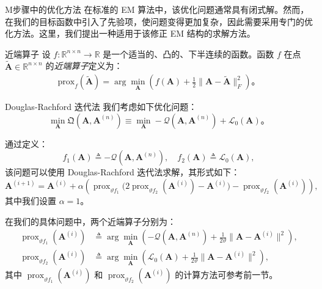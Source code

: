 \documentclass[presentation,aspectratio=169]{ctexbeamer}
\begin{document}
\begin{frame}{M步骤中的优化方法}
在标准的 EM 算法中，该优化问题通常具有闭式解。然而，在我们的目标函数中引入了先验项，使问题变得更加复杂，因此需要采用专门的优化方法。这里，我们提出一种适用于该修正 EM 结构的求解方法。
\end{frame}

\begin{frame}{近端算子}
设 \( f: \mathbb{R}^{n \times n} \to \mathbb{R} \) 是一个适当的、凸的、下半连续的函数。函数 \( f \) 在点 \(\tilde{\mathbf{A}} \in \mathbb{R}^{n \times n}\) 的\textit{近端算子}定义为：
\begin{align}
    \text{prox}_{f}(\tilde{\mathbf{A}}) = \arg\min_{\mathbf{A}} \left( f(\mathbf{A}) + \frac{1}{2} \| \mathbf{A} - \tilde{\mathbf{A}} \|^2_F \right)。
\end{align}
\end{frame}

\begin{frame}{Douglas-Rachford 迭代法}
我们考虑如下优化问题：
\begin{equation}
    \min_{\mathbf{A}} \mathfrak{Q}(\mathbf{A}, \mathbf{A}^{(n)}) \equiv \min_{\mathbf{A}} -\mathcal{Q}(\mathbf{A}, \mathbf{A}^{(n)}) + \mathcal{L}_0(\mathbf{A})。
\end{equation}
\pause

通过定义：
\begin{equation}
    f_1(\mathbf{A}) \triangleq -\mathcal{Q}(\mathbf{A}, \mathbf{A}^{(n)}), \quad f_2(\mathbf{A}) \triangleq \mathcal{L}_0(\mathbf{A}),
\end{equation}
该问题可以使用 Douglas-Rachford 迭代法求解，其形式如下：
\begin{equation}
    \mathbf{A}^{(i+1)} = \mathbf{A}^{(i)} + \alpha \left( \operatorname{prox}_{\vartheta f_1} \big(2 \operatorname{prox}_{\vartheta f_2}(\mathbf{A}^{(i)}) - \mathbf{A}^{(i)} \big) - \operatorname{prox}_{\vartheta f_2}(\mathbf{A}^{(i)}) \right),
\end{equation}
其中我们设置 \(\alpha = 1\)。
\end{frame}

\begin{frame}
在我们的具体问题中，两个近端算子分别为：
\begin{align}
    \operatorname{prox}_{\vartheta f_1}(\mathbf{A}^{(i)}) &\triangleq \arg\min_{\mathbf{A}} \left( -\mathcal{Q}(\mathbf{A}, \mathbf{A}^{(n)}) + \frac{1}{2\vartheta} \| \mathbf{A} - \mathbf{A}^{(i)} \|^2 \right), \\
    \operatorname{prox}_{\vartheta f_2}(\mathbf{A}^{(i)}) &\triangleq \arg\min_{\mathbf{A}} \left( \mathcal{L}_0(\mathbf{A}) + \frac{1}{2\vartheta} \| \mathbf{A} - \mathbf{A}^{(i)} \|^2 \right),
\end{align}
其中 \(\operatorname{prox}_{\vartheta f_1}(\mathbf{A}^{(i)})\) 和 \(\operatorname{prox}_{\vartheta f_2}(\mathbf{A}^{(i)})\) 的计算方法可参考前一节。
\end{frame}
\end{document}
